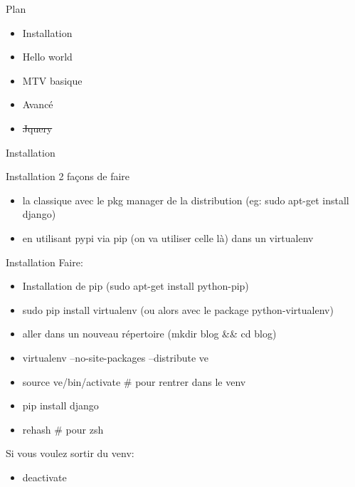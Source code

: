 \documentclass{beamer}
\begin{document}
\begin{frame}{Plan}
    \begin{itemize}
        \item Installation
        \item Hello world
        \item MTV basique
        \item Avancé
        \item \sout{Jquery}
    \end{itemize}
\end{frame}

\begin{frame}[fragile]{}
\begin{LARGE}
\begin{center}
Installation
\end{center}
\end{LARGE}
\end{frame}

\begin{frame}{Installation}
2 façons de faire
\begin{itemize}
    \item la classique avec le pkg manager de la distribution (eg: sudo apt-get install django)
    \item en utilisant pypi via pip (on va utiliser celle là) dans un virtualenv
\end{itemize}
\end{frame}

\begin{frame}{Installation}
    Faire:
    \begin{itemize}
        \item Installation de pip (sudo apt-get install python-pip)\pause
        \item sudo pip install virtualenv (ou alors avec le package python-virtualenv)\pause
        \item aller dans un nouveau répertoire (mkdir blog \&\& cd blog)\pause
        \item virtualenv --no-site-packages --distribute ve\pause
        \item source ve/bin/activate \# pour rentrer dans le venv\pause
        \item pip install django\pause
        \item rehash \# pour zsh
    \end{itemize}
    \vspace{3mm}
    \pause
    Si vous voulez sortir du venv:
    \begin{itemize}
        \item deactivate
    \end{itemize}
\end{frame}
\end{document}
